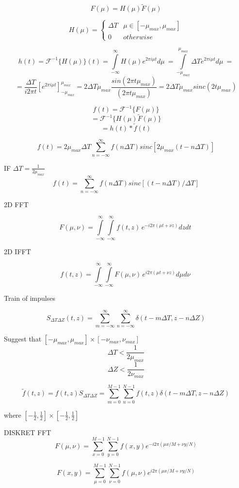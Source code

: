 \documentclass[12pt]{article}
\begin{document}
$$
F(\mu)
=
H(\mu)
\tilde{F}(\mu)
$$

$$
H(\mu)
=
\begin{cases}
\varDelta T & 
\mu \in [-\mu_{max},\mu_{max}] \\
0 & otherwise
\end{cases}
$$

$$
h(t)
=
\mathcal{F}^{-1}\{H(\mu)\}(t)
=
\int\limits_{-\infty}^{\infty}
H(\mu)
e^{2\pi i \mu t }
d\mu~
=
\int\limits_{-\mu_{max}}^{\mu_{max}}
\varDelta T
e^{2\pi i \mu t }
d\mu~
=
$$
$$
=
\frac{\varDelta T}
{i 2 \pi t} 
\left[
e^{	2\pi i \mu t }
\right]_{-\mu_{max}}^{\mu_{max}}
=
2\varDelta T \mu_{max}
\frac{sin(2\pi t \mu_{max}) }{(2\pi t \mu_{max})}
=
2\varDelta T \mu_{max}
sinc(2t\mu_{max})
$$

$$
f(t)
=
\mathcal{F}^{-1}
\{ F(\mu) \}
$$
$$
=
\mathcal{F}^{-1}
\{
H(\mu)\tilde{F}(\mu)
\}
$$
$$
=
h(t)*\tilde{f}(t)
$$

$$
f(t) 
=
2  \mu_{max} \varDelta T
\sum_{ n = - \infty}^{\infty}
f(n \varDelta T ) 
sinc[ 2  \mu_{max}  (t - n \varDelta T) 	]  
$$

IF $   \varDelta T = \frac{1}{2 \mu_{max}}$
$$
f(t) 
=
\sum_{ n = - \infty}^{\infty}
f(n \varDelta T ) 
sinc[ (t - n \varDelta T) / \varDelta T	]  
$$

2D FFT

$$
F(\mu,\nu)
=
\int\limits_{-\infty}^{\infty}
\int\limits_{-\infty}^{\infty}
f(t,z) \,
e^{-i 2 \pi( \mu t + \nu z)}
dz dt~
$$

2D IFFT

$$
f(t,z)
=
\int\limits_{-\infty}^{\infty}
\int\limits_{-\infty}^{\infty}
F(\mu,\nu) \,
e^{i 2 \pi( \mu t + \nu z)}
d\mu d\nu~
$$

Train of impulses

$$
S_{ \varDelta T \varDelta Z }
(t,z)
=
\sum_
{ m = - \infty}^{\infty}
\sum_
{ n = - \infty}^{\infty}
\delta(
t - m \varDelta T,
z - n \varDelta Z
)
$$

Suggest that $
[- \mu_{max},\mu_{max}] 
\times
[- \nu_{max},\nu_{max}] 
$
$$
\varDelta T 
<
\frac{1}{2 \mu_{max}}
$$
$$
\varDelta Z 
<
\frac{1}{2 \nu_{max}}
$$

$$
\tilde{f}(t,z) 
=
f(t,z)
S_{ \varDelta T \varDelta Z }
=
\sum_
{ m =  0}^{M-1}
\sum_
{ n =  0}^{N-1}
f(t,z)\delta(
t - m \varDelta T,
z - n \varDelta Z
)
$$

where 
$
[-\frac{1}{2},
\frac{1}{2}]
\times
[-\frac{1}{2},
\frac{1}{2}]
$

DISKRET FFT
$$
F(\mu,\nu)
=
\sum_
{ x =  0}^{M-1}
\sum_
{ y =  0}^{N-1}
f(x,y)
e^{
-i2\pi(\mu x / M +
 \nu y / N )
}
$$

$$
F(x,y)
=
\sum_
{ \mu =  0}^{M-1}
\sum_
{ \nu =  0}^{N-1}
f(\mu,\nu)
e^{
 i2\pi(\mu x / M +
 \nu y / N )
}
$$
\end{document}
